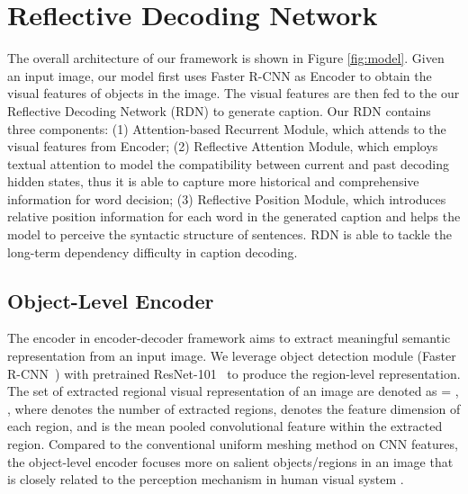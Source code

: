 \documentclass[10pt,twocolumn,letterpaper]{article}
\begin{document}
 

\section{Reflective Decoding Network}
\vspace{-0.05in}
The overall architecture of our framework is shown in Figure \ref{fig:model}.
Given an input image, our model first uses Faster R-CNN \cite{ren2015faster} as Encoder to obtain the visual features of objects in the image. 
The visual features are then fed to the our Reflective Decoding Network (RDN) to generate caption.
Our RDN contains three components:
(1) Attention-based Recurrent Module, which attends to the visual features from Encoder; 
(2) Reflective Attention Module, which employs textual attention to model the compatibility between current and past decoding hidden states, thus it is able to capture more historical and comprehensive information for word decision;
(3) Reflective Position Module, which introduces relative position information for each word in the generated caption and helps the model to perceive the syntactic structure of sentences.
RDN is able to tackle the long-term dependency difficulty in caption decoding. 

\vspace{-0.1in}


\subsection{Object-Level Encoder}
\vspace{-0.05in}
\label{sec:encoder} 
The encoder in encoder-decoder framework aims to extract meaningful semantic representation from an input image.
We leverage object detection module (Faster R-CNN~\cite{ren2015faster}) with pretrained ResNet-101~\cite{he2016deep} to produce the region-level representation.
The set of extracted regional visual representation  of an image  are denoted as  = , , where  denotes the number of extracted regions,  denotes the feature dimension of each region, and  is the mean pooled convolutional feature within the extracted region.
Compared to the conventional uniform meshing method on CNN features, the object-level encoder focuses more on salient objects/regions in an image that is closely related to the perception mechanism in human visual system \cite{buschman2007top}.
\end{document}
